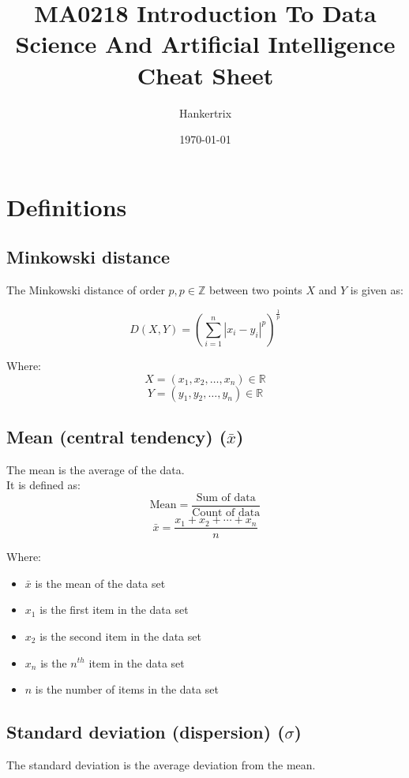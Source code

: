 \documentclass[11pt]{article}
\author{Hankertrix}
\date{\today}
\title{MA0218 Introduction To Data Science And Artificial Intelligence Cheat Sheet}
\begin{document}
\maketitle
\setcounter{tocdepth}{2}
\tableofcontents \clearpage\section{Definitions}
\label{sec:org497d557}

\subsection{Minkowski distance}
\label{sec:org912cf4d}
The Minkowski distance of order \(p, p \in \mathbb{Z}\) between two points \(X\) and \(Y\) is given as:

\[D(X, Y) = \left(\sum_{i = 1}^n \left| x_i - y_i \right|^p \right)^{\frac{1}{p}}\]

Where:
\[X = \left(x_1, x_2, \ldots, x_n \right) \in \mathbb{R}\]
\[Y = \left(y_1, y_2, \ldots, y_n \right) \in \mathbb{R}\]
\subsection{Mean (central tendency) (\(\bar{x}\))}
\label{sec:org9fa4add}
The mean is the average of the data.  \\

It is defined as:
\[\text{Mean} = \frac{\text{Sum of data}}{\text{Count of data}}\]
\[\bar{x} = \frac{x_1 + x_2 + \cdots + x_n}{n}\]

Where:
\begin{itemize}
\item \(\bar{x}\) is the mean of the data set
\item \(x_1\) is the first item in the data set
\item \(x_2\) is the second item in the data set
\item \(x_n\) is the \(n^{th}\) item in the data set
\item \(n\) is the number of items in the data set
\end{itemize}

 \newpage
\subsection{Standard deviation (dispersion) (\(\sigma\))}
\label{sec:org846cf13}
The standard deviation is the average deviation from the mean.  \\
\end{document}
